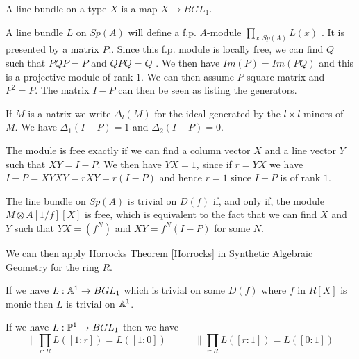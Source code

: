 A line bundle on a type $X$ is a map $X\rightarrow BGL_1$.


\medskip

 A line bundle $L$ on $Sp(A)$ will define a f.p. $A$-module $\prod_{x:Sp(A)}L(x)$ \cite{draft}.
It is presented by a matrix $P$..
Since this f.p. module is locally free, we can find $Q$ such that $PQP = P$ and
$QPQ = Q$ \cite{lombardi-quitte}. We then have $Im(P) = Im(PQ)$ and this is a projective module of rank $1$. We can then assume $P$ square matrix and
$P^2 = P$. The matrix $I-P$ can then be seen as listing the generators.

If $M$ is a natrix we write $\Delta_l(M)$ for the ideal generated by the $l\times l$ minors of
$M$. We have $\Delta_1(I-P) = 1$ and $\Delta_2(I-P) = 0$.

The module is free exactly if we can find a column vector $X$ and a line vector $Y$ such that
$XY = I-P$. We then have $YX = 1$, since if $r = YX$ we have $I-P = XYXY = rXY = r(I-P)$ and
hence $r = 1$ since $I-P$ is of rank $1$.



\medskip


The line bundle on $Sp(A)$ is trivial on $D(f)$ if, and only if, the module $M\otimes A[1/f][X]$ is free, which
is equivalent to the fact that we can find $X$ and $Y$ such that $YX = (f^N)$ and $XY = f^N(I-P)$ for some $N$.

We can then apply Horrocks Theorem \ref{Horrocks} in Synthetic Algebraic Geometry for the ring $R$.

\begin{proposition}
  If we have $L:\mathbb{A}^1\rightarrow BGL_1$ which is trivial on some $D(f)$ where $f$ in $R[X]$ is monic
  then $L$ is trivial on $\mathbb{A}^1$.
\end{proposition}

\begin{corollary}\label{c1}
  If we have $L:\mathbb{P}^1\rightarrow BGL_1$ then we have
  $$\|{\prod_{r:R}L([1:r]) = L([1:0])}~~~~~~~~~~~~~\|{\prod_{r:R}L([r:1]) = L([0:1])}$$
\end{corollary}
